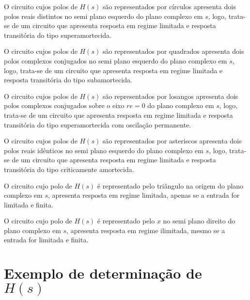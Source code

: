 \documentclass[12pt,fleqn]{book} %
\begin{document}
{\begin{remark}
O circuito cujos polos de $H(s)$ são representados por círculos apresenta dois polos reais distintos no semi plano esquerdo do plano complexo em $s$, logo, trata-se de um circuito que apresenta resposta em regime limitada e resposta transitória do tipo superamortecida.
\end{remark}

\begin{remark}
O circuito cujos polos de $H(s)$ são representados por quadrados apresenta dois polos complexos conjugados no semi plano esquerdo do plano complexo em $s$, logo, trata-se de um circuito que apresenta resposta em regime limitada e resposta transitória do tipo subamortecida.
\end{remark}

\begin{remark}
O circuito cujos polos de $H(s)$ são representados por losangos apresenta dois polos complexos conjugados sobre o eixo $re=0$ do plano complexo em $s$, logo, trata-se de um circuito que apresenta resposta em regime limitada e resposta transitória do tipo superamortecida com oscilação permanente.
\end{remark}

\begin{remark}
O circuito cujos polos de $H(s)$ são representados por asteriscos apresenta dois polos reais idênticos no semi plano esquerdo do plano complexo em $s$, logo, trata-se de um circuito que apresenta resposta em regime limitada e resposta transitória do tipo criticamente amortecida.
\end{remark}

\begin{remark}
O circuito cujo polo de $H(s)$ é representado pelo triângulo na origem do plano complexo em $s$, apresenta resposta em regime limitada, apenas se a entrada for limitada e finita.
\end{remark}

\begin{remark}
O circuito cujo polo de $H(s)$ é representado pelo $x$ no semi plano direito do plano complexo em $s$, apresenta resposta em regime ilimitada, mesmo se a entrada for limitada e finita.
\end{remark}

}
        
    \section{Exemplo de determinação de $H(s)$}
    
\end{document}
